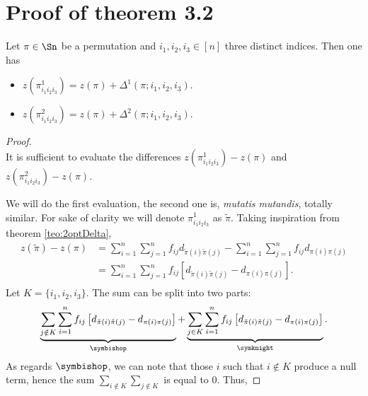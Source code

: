 \chapter{Proof of theorem 3.2}
\label{AppendiceB}

\begin{teo*}
	Let $\pi \in \Sn$ be a permutation and $i_1,i_2,i_3 \in [n]$ three distinct indices.  Then one has
	\begin{itemize}
		\item $z\left(\pi^1_{i_1i_2i_3}\right)= z(\pi) +\Delta^1(\pi;i_1,i_2,i_3)$. 
		\item $z\left(\pi^2_{i_1i_2i_3}\right)= z(\pi) +\Delta^2(\pi;i_1,i_2,i_3)$. 
	\end{itemize}
\end{teo*}
\begin{proof}\mbox{}\\
	\noindent It is sufficient to evaluate the differences $z\left(\pi^1_{i_1i_2i_3}\right)-z(\pi)$ and $z\left(\pi^2_{i_1i_2i_3}\right)-z(\pi)$.
	
	We will do  the first evaluation, the second one is, \textit{mutatis mutandis}, totally similar.
	For sake of clarity we will denote $\pi^1_{i_1i_2i_3}$ as $\tilde \pi$.
	Taking inspiration from theorem \ref{teo:2optDelta},
	\begin{equation}
	\label{eq:Delta1formula1}
	\begin{split}
	z(\tilde{\pi})-z(\pi)
	&=\sum_{i=1}^n\sum_{j=1}^n 
	f_{ij}d_{\tilde{\pi}(i)\tilde{\pi}(j)}
	-
	\sum_{i=1}^n\sum_{j=1}^n
	f_{ij}d_{\pi(i)\pi(j)} \\
	&=\sum_{i=1}^n\sum_{j=1}^n f_{ij}\left[d_{\tilde{\pi}(i)\tilde{\pi}(j)}-d_{\pi(i)\pi(j)}\right].\\
	\end{split}
	\end{equation}
	Let $K = \{i_1,i_2,i_3\}$. The sum can be split into two parts: 
	\[
	\underbrace{\sum_{j\notin K}\sum_{i=1}^n f_{ij}\left[d_{\tilde{\pi}(i)\tilde{\pi}(j)}-d_{\pi(i)\pi(j)}\right]}_{\symbishop}
	+
	\underbrace{\sum_{j\in K}\sum_{i=1}^n f_{ij}\left[d_{\tilde{\pi}(i)\tilde{\pi}(j)}-d_{\pi(i)\pi(j)}\right]}_{\symknight}.
	\]
	As regards $\symbishop$, we can note that those $i$ such that $i\notin K$ produce a null term, hence the sum $\sum_{i\notin K}\sum_{j\notin K}$ is equal to $0$. Thus,
	

\end{proof}
